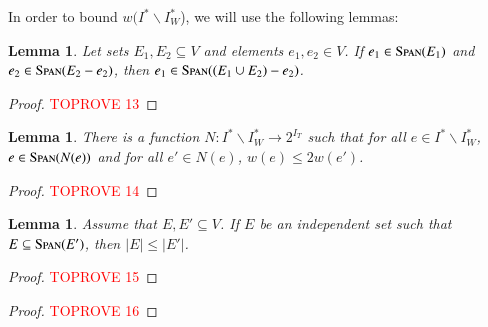 \documentclass[11pt]{article}
\newtheorem{lemma}[theorem]{Lemma}
\newcommand{\spn}{{\textsc{Span}}}
\begin{document}
In order to bound $w(I^* \backslash I^*_{W}$), we will use the following lemmas:

\begin{lemma}
\label{lm:matroid:e_in_span_span}
     Let sets $E_1, E_2 \subseteq V$ and elements $e_1, e_2 \in V$. If $e_1 \in \spn(E_1)$ and $e_2 \in \spn(E_2 - e_2)$, then $e_1 \in \spn((E_1 \cup E_2) - e_2)$.
\end{lemma}
\begin{proof}\textcolor{red}{TOPROVE 13}\end{proof}

\begin{lemma}\label{lm:hall}
  There is a function 
  $N: I^* \backslash I^*_{W} \to 2^{I_T}$ such that
  for all $e \in I^* \backslash I^*_{W}$, $e \in \spn(N(e))$ and  
  for all $e' \in N(e)$,
  $w(e) \le 2w(e')$.
\end{lemma}
\begin{proof}\textcolor{red}{TOPROVE 14}\end{proof}

\begin{lemma}
    \label{lm:matroid:hall_property_in_matroid}
    Assume that $E, E' \subseteq V$. If $E$ be an independent set such that $E \subseteq \spn(E')$, then $|E| \le |E'|$. 
\end{lemma}
\begin{proof}\textcolor{red}{TOPROVE 15}\end{proof}

\begin{proof}\textcolor{red}{TOPROVE 16}\end{proof}
  
  






























 
\end{document}
